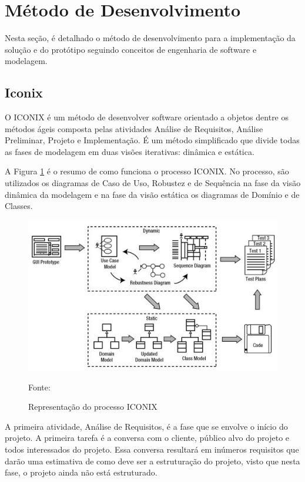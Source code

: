 \section{Método de Desenvolvimento}
\label{metodo-desenvolvimento}
Nesta seção, é detalhado o método de desenvolvimento para a implementação da solução e do protótipo seguindo conceitos de engenharia de software e modelagem.

\subsection{Iconix}
O ICONIX \cite{iconixuml} é um método de desenvolver software orientado a objetos dentre os métodos ágeis composta pelas atividades Análise de Requisitos, Análise Preliminar, Projeto e Implementação. É um método simplificado que divide todas as fases de modelagem em duas visões iterativas: dinâmica e estática.

A Figura \ref{iconix-img}   é o resumo de como funciona o processo ICONIX. No processo, são utilizados os diagramas de Caso de Uso, Robustez e de Sequência na fase da visão dinâmica da modelagem e na fase da visão estática os diagramas de Domínio e de Classes.

\begin{figure}[H]
  \centering
  \caption{Representação do processo ICONIX}
 \includegraphics[scale=0.7]{imagens/iconix.jpg} \par
\bigskip
\label{iconix-img}
   Fonte: \cite[p. 1]{iconixuml}
\end{figure}

A primeira atividade, Análise de Requisitos, é a fase que se envolve o início do projeto. A primeira tarefa é a conversa com o cliente, público alvo do projeto e todos interessados do projeto. Essa conversa resultará em inúmeros requisitos que darão uma estimativa de como deve ser a estruturação do projeto, visto que nesta fase, o projeto ainda não está estruturado.

